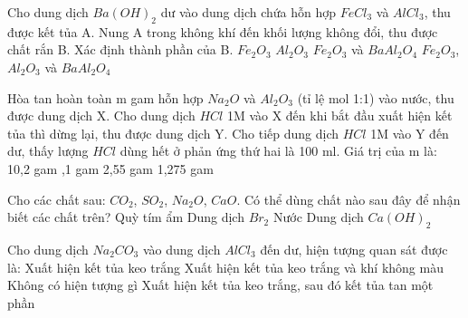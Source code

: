 \begin{ex}
	Cho dung dịch $Ba(OH)_2$ dư vào dung dịch chứa hỗn hợp $FeCl_3$ và $AlCl_3$, thu được kết tủa A. Nung A trong không khí đến khối lượng không đổi, thu được chất rắn B. Xác định thành phần của B.
	\choice
	{$Fe_2O_3$}
	{$Al_2O_3$}
	{\True $Fe_2O_3$ và $BaAl_2O_4$}
	{$Fe_2O_3$, $Al_2O_3$ và $BaAl_2O_4$}
\end{ex}
\begin{ex}
	Hòa tan hoàn toàn m gam hỗn hợp $Na_2O$ và $Al_2O_3$ (tỉ lệ mol 1:1) vào nước, thu được dung dịch X. Cho dung dịch $HCl$ 1M vào X đến khi bắt đầu xuất hiện kết tủa thì dừng lại, thu được dung dịch Y. Cho tiếp dung dịch $HCl$ 1M vào Y đến dư, thấy lượng $HCl$ dùng hết ở phản ứng thứ hai là 100 ml. Giá trị của m là:
	\choice
	{10,2 gam}
	{,1 gam}
	{2,55 gam}
	{1,275 gam}
\end{ex}
\begin{ex}
	Cho các chất sau: $CO_2$, $SO_2$, $Na_2O$, $CaO$. Có thể dùng chất nào sau đây để nhận biết các chất trên?
	\choice
	{Quỳ tím ẩm}
	{\True Dung dịch $Br_2$}
	{Nước}
	{Dung dịch $Ca(OH)_2$}
\end{ex}
\begin{ex}
	Cho dung dịch $Na_2CO_3$ vào dung dịch $AlCl_3$ đến dư, hiện tượng quan sát được là:
	\choice
	{Xuất hiện kết tủa keo trắng}
	{Xuất hiện kết tủa keo trắng và khí không màu}
	{Không có hiện tượng gì}
	{\True Xuất hiện kết tủa keo trắng, sau đó kết tủa tan một phần}
\end{ex}

